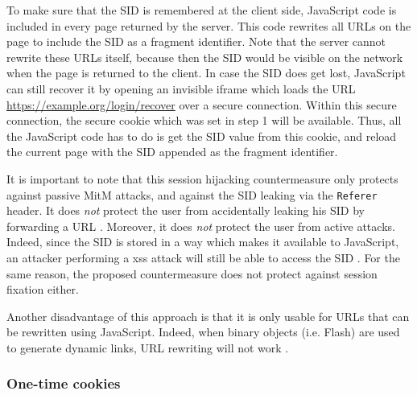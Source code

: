 To make sure that the SID is remembered at the client side, JavaScript code is included in every page returned by the server. This code rewrites all URLs on the page to include the SID as a fragment identifier. Note that the server cannot rewrite these URLs itself, because then the SID would be visible on the network when the page is returned to the client. In case the SID does get lost, JavaScript can still recover it by opening an invisible iframe which loads the URL \url{https://example.org/login/recover} over a secure connection. Within this secure connection, the secure cookie which was set in step 1 will be available. Thus, all the JavaScript code has to do is get the SID value from this cookie, and reload the current page with the SID appended as the fragment identifier.

It is important to note that this session hijacking countermeasure only protects against passive MitM attacks, and against the SID leaking via the \texttt{Referer} header. It does \emph{not} protect the user from accidentally leaking his SID by forwarding a URL \cite{Adida2008}. Moreover, it does \emph{not} protect the user from active attacks. Indeed, since the SID is stored in a way which makes it available to JavaScript, an attacker performing a \gls{xss} attack will still be able to access the SID \cite{Dacosta2011}. For the same reason, the proposed countermeasure does not protect against session fixation either.

Another disadvantage of this approach is that it is only usable for URLs that can be rewritten using JavaScript. Indeed, when binary objects (i.e. Flash) are used to generate dynamic links, URL rewriting will not work \cite{Dacosta2011}.

\subsubsection{One-time cookies}

